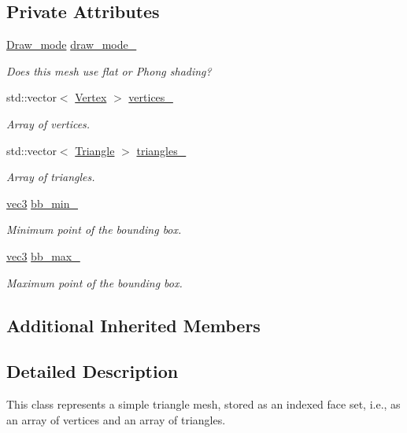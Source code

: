 \subsection*{Private Attributes}
\begin{DoxyCompactItemize}
\item 
\hyperlink{classMesh_aa4144c3cad2e62df26ad90131e59aa6a}{Draw\+\_\+mode} \hyperlink{classMesh_a00bc30acf9fbbf37a6626aefeeae40ab}{draw\+\_\+mode\+\_\+}
\begin{DoxyCompactList}\small\item\em Does this mesh use flat or Phong shading? \end{DoxyCompactList}\item 
std\+::vector$<$ \hyperlink{structMesh_1_1Vertex}{Vertex} $>$ \hyperlink{classMesh_a986edf1ab1d37e517ff8adc928519528}{vertices\+\_\+}
\begin{DoxyCompactList}\small\item\em Array of vertices. \end{DoxyCompactList}\item 
std\+::vector$<$ \hyperlink{structMesh_1_1Triangle}{Triangle} $>$ \hyperlink{classMesh_a13455b3ace274f1d3d36ee45c7a3988d}{triangles\+\_\+}
\begin{DoxyCompactList}\small\item\em Array of triangles. \end{DoxyCompactList}\item 
\hyperlink{classvec3}{vec3} \hyperlink{classMesh_a92a3f0d35d2508cae425862f4d302943}{bb\+\_\+min\+\_\+}
\begin{DoxyCompactList}\small\item\em Minimum point of the bounding box. \end{DoxyCompactList}\item 
\hyperlink{classvec3}{vec3} \hyperlink{classMesh_acb17b74d4630a25eb2586a5d2c89975d}{bb\+\_\+max\+\_\+}
\begin{DoxyCompactList}\small\item\em Maximum point of the bounding box. \end{DoxyCompactList}\end{DoxyCompactItemize}
\subsection*{Additional Inherited Members}


\subsection{Detailed Description}
This class represents a simple triangle mesh, stored as an indexed face set, i.\+e., as an array of vertices and an array of triangles. 

